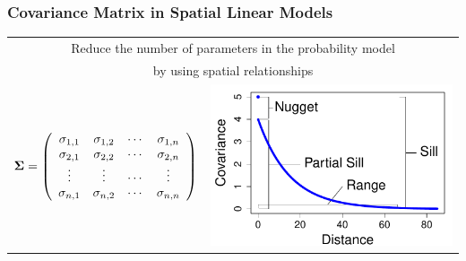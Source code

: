 \documentclass[mathserif,compress]{beamer}\usepackage{graphicx, color}
\makeatletter
\def\maxwidth{ %
  \ifdim\Gin@nat@width>\linewidth
    \linewidth
  \else
    \Gin@nat@width
  \fi
}
\newenvironment{knitrout}{}{} %
\def\bSigma{\mbox{\boldmath $\Sigma$}}
\makeatother
\begin{document}
\begin{frame} 
\frametitle{Covariance Matrix in Spatial Linear Models}
    
	\vspace{.2cm}
	\begin{tabular} {p{5cm} p{4cm}}
		\multicolumn{2}{c}{Reduce the number of parameters in the probability model} \\
		 \multicolumn{2}{c}{by using spatial relationships} \\
		\vspace{-.5cm}
		\begin{equation*} 
			 \bSigma = \left( \begin{array}{cccc}
				\sigma_{1,1} & \sigma_{1,2} & \cdots & \sigma_{1,n} \\
				\sigma_{2,1} & \sigma_{2,2} & \cdots & \sigma_{2,n} \\
				\vdots & \vdots & \cdots & \vdots \\
				\sigma_{n,1} & \sigma_{n,2} & \cdots & \sigma_{n,n} 
			\end{array} \right)
		\end{equation*} &

 		\vspace{-.1cm}
\begin{knitrout}\tiny
\definecolor{shadecolor}{rgb}{0.969, 0.969, 0.969}\color{fgcolor}

{\centering \includegraphics[width=\maxwidth]{figure/autCovGraph} 

}



\end{knitrout}


\end{tabular}
\end{frame}
\end{document}
